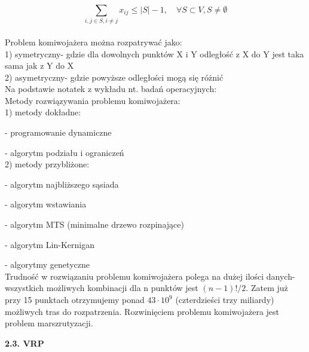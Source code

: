 \documentclass[a4paper, twoside, 12pt, justified]{article}
\begin{document}
	  \begin{equation}
	  	  {\sum\limits_{i,j \in S, i \neq j} x_{ij} \leq |S| - 1, \quad \forall S \subset V, S \neq \emptyset }
	  \end{equation}\\
	
	
	
	Problem komiwojażera można rozpatrywać jako:\\
	1) symetryczny- gdzie dla dowolnych punktów X i Y odległość z X do Y jest taka sama jak z Y do X\\
	2) asymetryczny- gdzie powyższe odległości mogą się różnić\\
	
	Na podstawie notatek z wykładu nt. badań operacyjnych:\\
	Metody rozwiązywania problemu komiwojażera:\\
	1) metody dokładne:

	\hspace{5mm}- programowanie dynamiczne

	\hspace{5mm}- algorytm podziału i ograniczeń\\
	2) metody przybliżone:
	
	\hspace{5mm}- algorytm najbliższego sąsiada
	
	\hspace{5mm}- algorytm wstawiania
	
	\hspace{5mm}- algorytm MTS (minimalne drzewo rozpinające)
	
	\hspace{5mm}- algorytm Lin-Kernigan
	
	\hspace{5mm}- algorytmy genetyczne\\
	
	Trudność w rozwiązaniu problemu komiwojażera polega na dużej ilości danych- wszystkich możliwych kombinacji dla n punktów jest $(n-1)!/2$. Zatem już przy 15 punktach otrzymujemy ponad $43\cdot10^9$ (czterdzieści trzy miliardy) możliwych tras do rozpatrzenia. Rozwinięciem problemu komiwojażera jest problem marszrutyzacji.
	
	\begin{flushleft}
		\begin{large}
			\textbf{2.3. VRP}
		\end{large}
	\end{flushleft}
	\vspace{5mm} %
	
\end{document}
